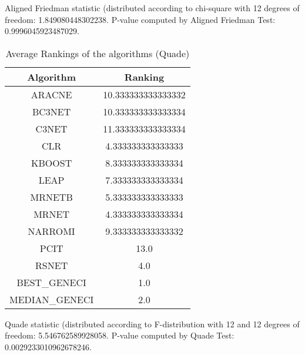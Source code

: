 \documentclass[a4paper,10pt]{article}
\begin{document}
\begin{landscape}
Aligned Friedman statistic (distributed according to chi-square with 12 degrees of freedom: 1.849080448302238. 
P-value computed by Aligned Friedman Test: 0.9996045923487029.\newline


\newpage

\begin{table}[!htp]
\centering
\caption{Average Rankings of the algorithms (Quade)
}\begin{tabular}{c|c}
Algorithm&Ranking\\
\hline
ARACNE&10.333333333333332\\
BC3NET&10.333333333333334\\
C3NET&11.333333333333334\\
CLR&4.333333333333333\\
KBOOST&8.333333333333334\\
LEAP&7.333333333333334\\
MRNETB&5.333333333333333\\
MRNET&4.333333333333334\\
NARROMI&9.333333333333332\\
PCIT&13.0\\
RSNET&4.0\\
BEST_GENECI&1.0\\
MEDIAN_GENECI&2.0\\
\end{tabular}
\end{table}
Quade statistic (distributed according to F-distribution with 12 and 12 degrees of freedom: 5.546762589928058. 
P-value computed by Quade Test: 0.0029233010962678246.\newline


\newpage


\end{landscape}
\end{document}

